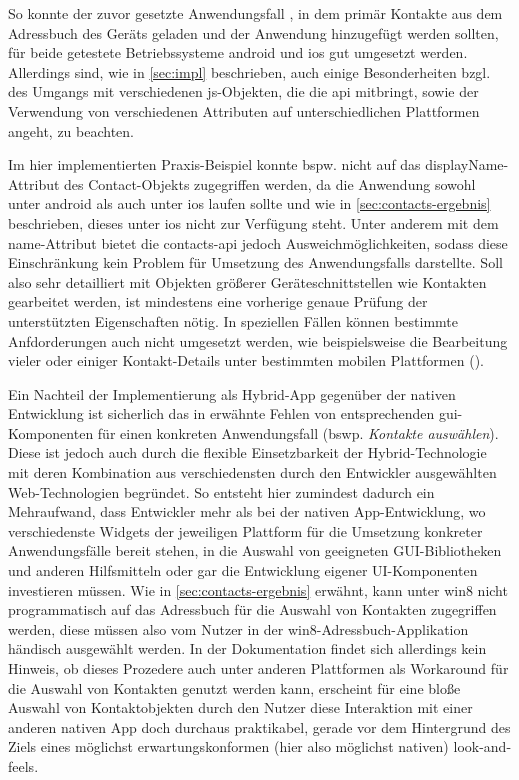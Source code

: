 So konnte der zuvor gesetzte Anwendungsfall , in dem primär Kontakte aus dem Adressbuch des Geräts geladen und der Anwendung hinzugefügt werden sollten, für beide getestete Betriebssysteme \gls{android} und \gls{ios} gut umgesetzt werden. 
Allerdings sind, wie in \autoref{sec:impl} beschrieben, auch einige Besonderheiten bzgl. des Umgangs mit verschiedenen \gls{js}-Objekten, die die api mitbringt, sowie der Verwendung von verschiedenen Attributen auf unterschiedlichen Plattformen angeht, zu beachten.

Im hier implementierten Praxis-Beispiel konnte bspw. nicht auf das displayName-Attribut des Contact-Objekts zugegriffen werden, da die Anwendung sowohl unter android als auch unter ios laufen sollte und wie in \autoref{sec:contacts-ergebnis} beschrieben, dieses unter ios nicht zur Verfügung steht. Unter anderem mit dem name-Attribut bietet die contacts-api jedoch Ausweichmöglichkeiten, sodass diese Einschränkung kein Problem für Umsetzung des Anwendungsfalls darstellte.
Soll also sehr detailliert mit Objekten größerer Geräteschnittstellen wie \zB Kontakten gearbeitet werden, ist mindestens eine vorherige genaue Prüfung der unterstützten Eigenschaften nötig. In speziellen Fällen können bestimmte Anfdorderungen auch nicht umgesetzt werden, wie beispielsweise die Bearbeitung vieler oder einiger Kontakt-Details unter bestimmten mobilen Plattformen ().

Ein Nachteil der Implementierung als Hybrid-App gegenüber der nativen Entwicklung ist sicherlich das in  erwähnte Fehlen von entsprechenden \gls{gui}-Komponenten für einen konkreten Anwendungsfall (bswp. \emph{Kontakte auswählen}). 
Diese ist jedoch auch durch die flexible Einsetzbarkeit der Hybrid-Technologie mit deren Kombination aus verschiedensten durch den Entwickler ausgewählten Web-Technologien begründet. 
So entsteht hier zumindest dadurch ein Mehraufwand, dass Entwickler mehr als bei der nativen App-Entwicklung, wo verschiedenste Widgets der jeweiligen Plattform für die Umsetzung konkreter Anwendungsfälle bereit stehen, in die Auswahl von geeigneten GUI-Bibliotheken und anderen Hilfsmitteln oder gar die Entwicklung eigener UI-Komponenten investieren müssen.
Wie in \autoref{sec:contacts-ergebnis} erwähnt, kann unter \gls{win8} nicht programmatisch auf das Adressbuch für die Auswahl von Kontakten zugegriffen werden, diese müssen also vom Nutzer in der \gls{win8}-Adressbuch-Applikation händisch ausgewählt werden.
In der Dokumentation findet sich allerdings kein Hinweis, ob dieses Prozedere auch unter anderen Plattformen als Workaround für die Auswahl von Kontakten genutzt werden kann, erscheint für eine bloße Auswahl von Kontaktobjekten durch den Nutzer diese Interaktion mit einer anderen nativen App doch durchaus praktikabel, gerade vor dem Hintergrund des Ziels eines möglichst erwartungskonformen (hier also möglichst nativen) \glspl{look-and-feel}. 

